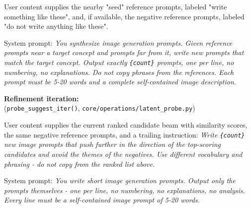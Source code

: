 User content supplies the nearby "seed" reference prompts, labeled "write something like these", and, if available, the negative reference prompts, labeled "do not write anything like these".

System prompt: \textit{You synthesize image generation prompts. Given reference prompts near a target concept and prompts far from it, write new prompts that match the target concept. Output exactly \texttt{\{count\}} prompts, one per line, no numbering, no explanations. Do not copy phrases from the references. Each prompt must be 5-20 words and a complete self-contained image description.}

\textbf{Refinement iteration:}\\
(\texttt{probe\_suggest\_iter()}, \texttt{core/operations/latent\_probe.py})

User content supplies the current ranked candidate beam with similarity scores, the same negative reference prompts, and a trailing instruction: \textit{Write \texttt{\{count\}} new image prompts that push further in the direction of the top-scoring candidates and avoid the themes of the negatives. Use different vocabulary and phrasing - do not copy from the ranked list above.}

System prompt: \textit{You write short image generation prompts. Output only the prompts themselves - one per line, no numbering, no explanations, no analysis. Every line must be a self-contained image prompt of 5-20 words.}
